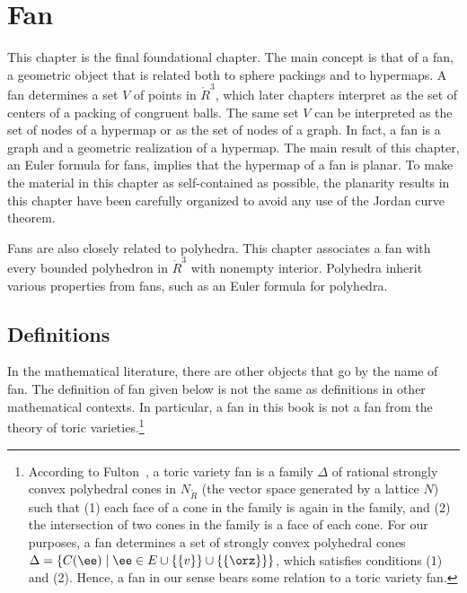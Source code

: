 \chapter{Fan}\label{sec:fan}




\begin{summary}
  This chapter is the final foundational chapter.  The main concept is
  that of a fan, a geometric object that is related both to sphere
  packings and to hypermaps.  A fan determines a set $V$ of points in
  $\ring{R}^3$, which later chapters interpret as the set of centers
  of a packing of congruent balls.  The same set $V$ can be
  interpreted as the set of nodes of a hypermap or as the set of
  nodes of a graph.  In fact, a fan is a graph and a geometric
  realization of a hypermap.  The main result of this chapter, an
  Euler formula for fans,  implies that the hypermap of a
  fan is planar.  To make the material in this chapter as self-contained
 as possible, the planarity results in this chapter have been carefully
  organized to avoid any use of the Jordan curve theorem.

  Fans are also closely related to polyhedra.  This chapter associates
  a fan with every bounded polyhedron in $\ring{R}^3$ with nonempty
  interior.  Polyhedra inherit various properties from fans, such
  as an Euler formula for polyhedra.
\end{summary}


%
%
%
%
%

\section{Definitions}



\begin{remark}
  In the mathematical literature, there are other objects that go by
  the name of fan.  The definition of fan given below is not the same
  as definitions in other mathematical contexts.  In particular, a fan
  in this book is not a fan from the theory of toric
  varieties.\footnote{According to
    Fulton~\cite{Fulton}, %
    a toric variety fan is a family $\Delta$ of rational strongly
    convex polyhedral cones in $N_{\ring{R}}$ (the vector space
    generated by a lattice $N$) such that (1) each face of a cone in
    the family is again in the family, and (2) the intersection of two
    cones in the family is a face of each cone.  For our purposes, a
    fan determines a set of strongly convex polyhedral cones $\Delta =
    \{ C(\ee)\mid \ee\in E\cup \{ \{v \} \} \cup \{ \{ \orz\} \} \}$,
    which satisfies conditions (1) and (2).  Hence, a fan in our sense
    bears some relation to a toric variety fan.}
\end{remark}

